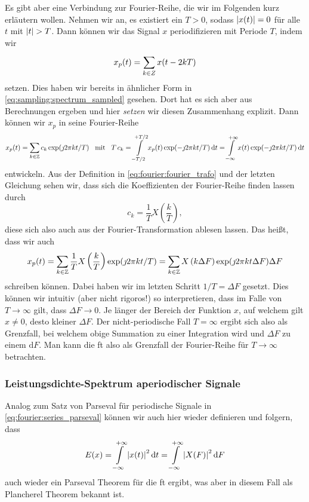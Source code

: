 Es gibt aber eine Verbindung zur Fourier-Reihe, die wir im Folgenden kurz erläutern wollen.
Nehmen wir an, es existiert ein $T > 0$, sodass ${\left| x(t) \right|} = 0$ für alle $t$ mit ${\left| t \right|} > T$.
Dann können wir das Signal $x$ periodifizieren mit Periode $T$, indem wir
\[
x_p(t) = {\sum\limits_{k \in Z}^{}{x(t - 2kT)}}
\]
setzen.
Dies haben wir bereits in ähnlicher Form in \eqref{eq:sampling:spectrum_sampled} gesehen. 
Dort hat es sich aber aus Berechnungen ergeben und hier \emph{setzen} wir diesen Zusammenhang explizit.
Dann können wir $x_p$ in seine Fourier-Reihe 
\[
x_p(t) = {\sum\limits_{k \in \mathbb{Z}}^{}{c_k \exp(\jmath 2 \pi k t/T)}}
{\hspace{3mm} \text{mit} \hspace{3mm}}
T\,c_k = {\int\limits_{-T/2}^{+T/2}{x_p(t) \exp(- \jmath 2 \pi k t/T)}\,\mathrm{d}{t}}
    = {\int\limits_{-\infty}^{+\infty}{x(t) \exp(- \jmath 2 \pi k t/T)}\,\mathrm{d}{t}}
\]
entwickeln.
Aus der Definition in \eqref{eq:fourier:fourier_trafo} und der letzten Gleichung sehen wir, dass sich die Koeffizienten der Fourier-Reihe finden lassen durch
\begin{equation}\label{eq:fourier:c_k_fourier}
    c_k = \frac 1T X\left(\frac kT\right),
\end{equation}
diese sich also auch aus der Fourier-Transformation ablesen lassen.
Das heißt, dass wir auch
\[
x_p(t) = {\sum\limits_{k \in \mathbb{Z}}^{}{\frac 1T X\left(\frac kT\right) \exp(\jmath 2 \pi k t/T)}}
       = {\sum\limits_{k \in \mathbb{Z}}^{}{X\left(k \Delta F\right) \exp(\jmath 2 \pi k t \Delta F) \Delta F}}
\]
schreiben können.
Dabei haben wir im letzten Schritt $1/T = \Delta F$ gesetzt.
Dies können wir intuitiv (aber nicht rigoros!) so interpretieren, dass im Falle von $T \rightarrow \infty$ gilt, dass $\Delta F \rightarrow 0$.
Je länger der Bereich der Funktion $x$, auf welchem gilt $x \neq 0$, desto kleiner $\Delta F$.
Der nicht-periodische Fall $T = \infty$ ergibt sich also als Grenzfall, bei welchem obige Summation zu einer Integration wird und $\Delta F$ zu einem $\mathrm{d}F$.
Man kann die \acrlong{ft} also als Grenzfall der Fourier-Reihe für $T \rightarrow \infty$ betrachten.
%
%
\subsubsection{Leistungsdichte-Spektrum aperiodischer Signale}
%
Analog zum Satz von Parseval für periodische Signale in \eqref{eq:fourier:series_parseval} können wir auch hier wieder definieren und folgern, dass
\begin{equation}
E(x) = {\int\limits_{-\infty}^{+\infty}{{\left| x(t) \right|}^2}\,\mathrm{d}{t}}
     = {\int\limits_{-\infty}^{+\infty}{{\left| X(F) \right|}^2}\,\mathrm{d}{F}}
\end{equation}
auch wieder ein Parseval Theorem für die \acrlong{ft} ergibt, was aber in diesem Fall als Plancherel Theorem bekannt ist.

